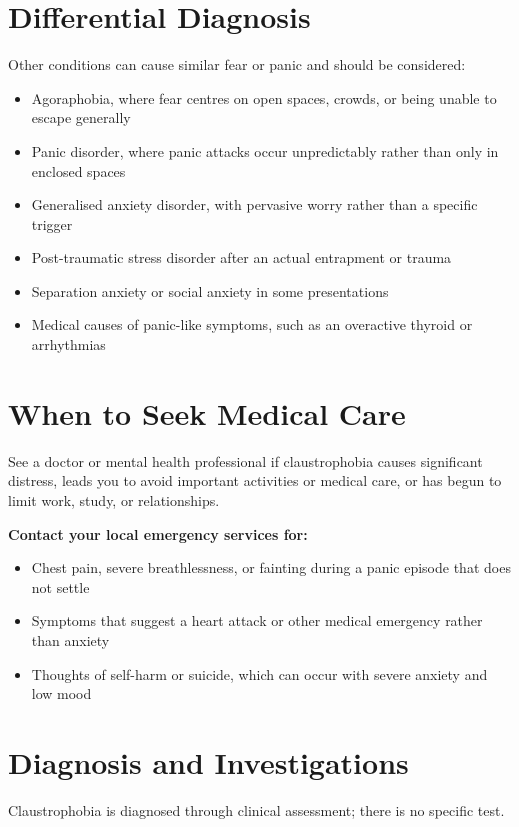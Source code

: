 \section*{Differential Diagnosis}
Other conditions can cause similar fear or panic and should be considered:

\begin{itemize}
    \item Agoraphobia, where fear centres on open spaces, crowds, or being unable to escape generally
    \item Panic disorder, where panic attacks occur unpredictably rather than only in enclosed spaces
    \item Generalised anxiety disorder, with pervasive worry rather than a specific trigger
    \item Post-traumatic stress disorder after an actual entrapment or trauma
    \item Separation anxiety or social anxiety in some presentations
    \item Medical causes of panic-like symptoms, such as an overactive thyroid or arrhythmias
\end{itemize}

\section*{When to Seek Medical Care}
See a doctor or mental health professional if claustrophobia causes significant distress, leads you to avoid important activities or medical care, or has begun to limit work, study, or relationships.

\textbf{Contact your local emergency services for:}
\begin{itemize}
    \item Chest pain, severe breathlessness, or fainting during a panic episode that does not settle
    \item Symptoms that suggest a heart attack or other medical emergency rather than anxiety
    \item Thoughts of self-harm or suicide, which can occur with severe anxiety and low mood
\end{itemize}

\section*{Diagnosis and Investigations}
Claustrophobia is diagnosed through clinical assessment; there is no specific test.

